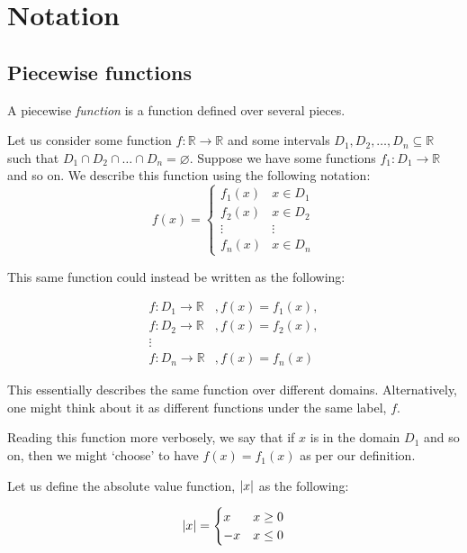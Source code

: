 \section{Notation}
\subsection{Piecewise functions}
A piecewise \textit{function} is a function defined over several pieces. 

Let us consider some function $f:\mathbb{R}\to\mathbb{R}$ and some intervals ${D_1,D_2,\dots,D_n\subseteq\mathbb{R}}$ such that ${D_1\cap D_2\cap \dots\cap D_n=\varnothing}$. Suppose we have some functions $f_1: D_1\to\mathbb{R}$ and so on. We describe this function using the following notation:
$$
    f(x) = \begin{cases} 
        f_1(x) & x\in D_1 \\
        f_2(x) & x\in D_2 \\
        \vdots & \vdots \\
        f_n(x) & x\in D_n
    \end{cases}
$$

This same function could instead be written as the following:

\begin{align*}
    f:D_1\to\mathbb{R}&, f(x)=f_1(x), \\
    f:D_2\to\mathbb{R}&, f(x)=f_2(x), \\
    \vdots \\
    f:D_n\to\mathbb{R}&, f(x)=f_n(x)
\end{align*}

This essentially describes the same function over different domains. Alternatively, one might think about it as different functions under the same label, $f$.

Reading this function more verbosely, we say that if $x$ is in the domain $D_1$ and so on, then we might `choose' to have $f(x)=f_1(x)$ as per our definition.

\begin{example}
    Let us define the absolute value function, $\abs{x}$ as the following:

    $$
        \abs{x} = \begin{cases}
            x & x\geq 0 \\
            -x & x\leq 0
        \end{cases}
    $$
\end{example}